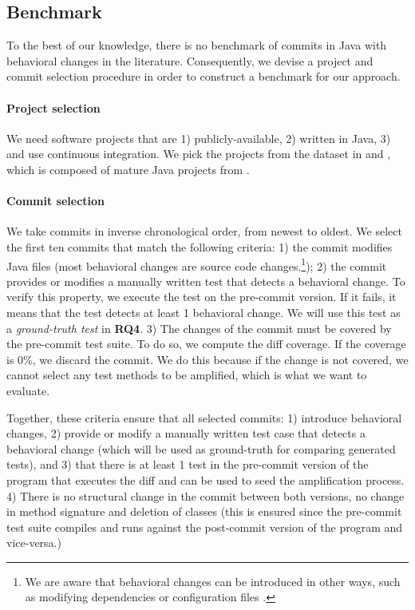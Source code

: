 \subsection{Benchmark}
\label{sec:benchmark}
To the best of our knowledge, there is no benchmark of commits in Java with behavioral changes in the literature. Consequently, we devise a project and commit selection procedure in order to construct a benchmark for our approach.

\paragraph{Project selection}
We need software projects that are
1) publicly-available,
2) written in Java,
3) and use continuous integration.
%
We pick the projects from the dataset in \cite{descartes} and \cite{dspot-emse}, which is composed of mature Java projects from \gh.

\paragraph{Commit selection}
We take commits in inverse chronological order, from newest to oldest.
We select the first ten commits that match the following criteria:
1) the commit modifies Java files (most behavioral changes are source code changes.\footnote{We are aware that behavioral changes can be introduced in other ways, such as modifying dependencies or configuration files \cite{Test:Coverage:Evolution}.});
2) the commit provides or modifies a manually written test that detects a behavioral change. 
To verify this property, we execute the test on the pre-commit version. 
If it fails, it means that the test detects at least 1 behavioral change.
We will use this test as a \textit{ground-truth test} in \textbf{RQ4}.
3) The changes of the commit must be covered by the pre-commit test suite.
To do so, we compute the diff coverage. 
If the coverage is 0\%, we discard the commit. 
We do this because if the change is not covered, we cannot select any test methods to be amplified, which is what we want to evaluate.

Together, these criteria ensure that all selected commits:
1) introduce behavioral changes,
2) provide or modify a manually written test case that detects a behavioral change (which will be used as ground-truth for comparing generated tests), and
3) that there is at least 1 test in the pre-commit version of the program that executes the diff and can be used to seed the amplification process.
4) There is no structural change in the commit between both versions, \eg no change in method signature and deletion of classes (this is ensured since the pre-commit test suite compiles and runs against the post-commit version of the program and vice-versa.)

